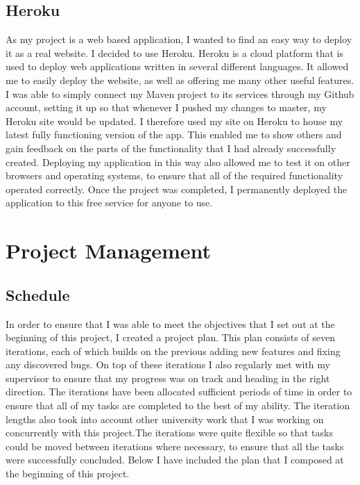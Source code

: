 \subsection{Heroku\label{heroku}}
As my project is a web based application, I wanted to find an easy way to deploy it as a real website. I decided to use Heroku. Heroku is a cloud platform that is used to deploy web applications written in several different languages. It allowed me to easily deploy the website, as well as offering me many other useful features. I was able to simply connect my Maven project to its services through my Github account, setting it up so that whenever I pushed my changes to master, my Heroku site would be updated. I therefore used my site on Heroku to house my latest fully functioning version of the app. This enabled me to show others and gain feedback on the parts of the functionality that I had already successfully created. Deploying my application in this way also allowed me to test it on other browsers and operating systems, to ensure that all of the required functionality operated correctly. Once the project was completed, I permanently deployed the application to this free service for anyone to use.

\pagebreak

\section{Project Management}

\subsection{Schedule \label{schedule}}

In order to ensure that I was able to meet the objectives that I set out at the beginning of this project, I created a project plan. This plan consists of seven iterations, each of which builds on the previous adding new features and fixing any discovered bugs. On top of these iterations I also regularly met with my supervisor to ensure that my progress was on track and heading in the right direction. The iterations have been allocated sufficient periods of time in order to ensure that all of my tasks are completed to the best of my ability. The iteration lengths also took into account other university work that I was working on concurrently with this project.The iterations were quite flexible so that tasks could be moved between iterations where necessary, to ensure that all the tasks were successfully concluded. Below I have included the plan that I composed at the beginning of this project. 


